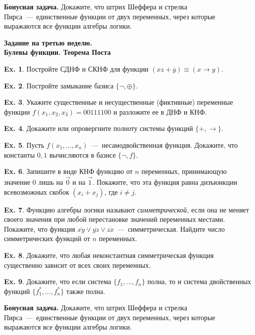 \documentclass[12pt,a5paper,fleqn]{article}
\theoremstyle{definition}
\newtheorem{Ex}{Ex.}
\begin{document}
\textbf{Бонусная задача.} Докажите, что штрих Шеффера и стрелка Пирса~---~единственные
функции от двух переменных, через которые выражаются все функции алгебры логики.


\newpage
\setcounter{Ex}{0}

\begin{center}
	{\bf \Large Задание на третью неделю. \\ \normalsize Булевы функции. Теорема Поста}
\end{center}
\vspace{0.4cm}

\begin{Ex}
	Постройте СДНФ и СКНФ для функции $(xz+\overline{y})\equiv(x\to y)$.
\end{Ex}

\begin{Ex}
	Постройте замыкание базиса $\{\neg,\oplus\}$.
\end{Ex}

\begin{Ex}
	Укажите существенные и несущественные (фиктивные) переменные функции 
	$f(x_1,x_2,x_3)=00111100$ и разложите ее в ДНФ и КНФ.
\end{Ex}

\begin{Ex}
	Докажите или опровергните полноту системы функций $\{+,\to\}$.
\end{Ex}

\begin{Ex}
	Пусть $f(x_1,\ldots,x_n)$~---~несамодвойственная функция. Докажите, что
	константы $0, 1$ вычисляются в базисе $\{\neg, f\}$.
\end{Ex}

\begin{Ex}
	Запишите в виде КНФ функцию от $n$ переменных, принимающую значение
	$0$ лишь на $\vec{0}$ и на $\vec{1}$. Покажите, что эта функция равна
	дизъюнкции всевозможных скобок $(x_i+x_j)$, где $i\neq j$. 
\end{Ex}

\begin{Ex}
	Функцию алгебры логики называют \textit{симметрической,} если она не 
	меняет своего значения при любой перестановке значений переменных местами.
	Покажите, что функция $\overline{xy}\vee\overline{yz}\vee\overline{zx}$~---~симметрическая.
	Найдите число симметрических функций от $n$ переменных.
\end{Ex}

\begin{Ex}
	Докажите, что любая неконстантная симметрическая функция существенно зависит
	от всех своих переменных.
\end{Ex}

\begin{Ex}
	Докажите, что если система $\{f_1,\ldots,f_n\}$ полна, то и система
	двойственных функций $\{f_1^*, \ldots, f_n^*\}$ также полна.
\end{Ex}

\textbf{Бонусная задача.} Докажите, что штрих Шеффера и стрелка Пирса~---~единственные
функции от двух переменных, через которые выражаются все функции алгебры логики.
\end{document}

